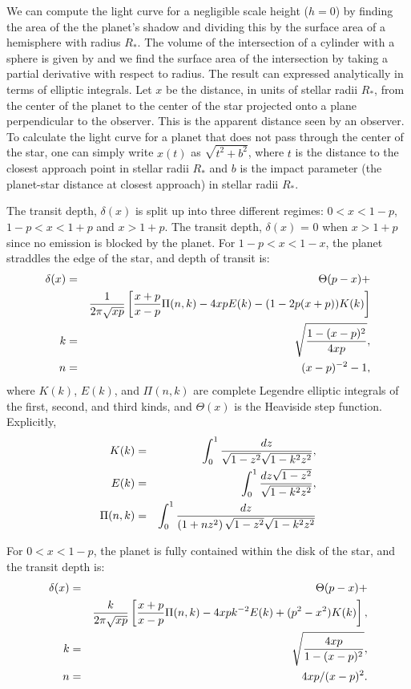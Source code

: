 \documentclass[manuscript]{aastex}
\begin{document}
We can compute the light curve for a negligible scale height ($h=0$) by finding the area of the the planet's shadow and dividing this by the surface area of a hemisphere with radius $R_*$. The volume of the intersection of a cylinder with a sphere is given by \citet{lamarche} and we find the surface area of the intersection by taking a partial derivative with respect to radius. The result can expressed analytically in terms of elliptic integrals.
Let $x$ be the distance, in units of stellar radii $R_*$, from the center of the planet to the center of the star projected onto a plane perpendicular to the observer. This is the apparent distance seen by an observer. To calculate the light curve for a planet that does not pass through the center of the star, one can simply write $x(t)$ as $\sqrt{t^2+b^2}$, where $t$ is the distance to the closest approach point in stellar radii $R_*$ and $b$ is the impact parameter (the planet-star distance at closest approach) in stellar radii $R_*$. 

The transit depth, $\delta (x)$ is split up into three different regimes: $0 < x < 1 -p$, $1 - p < x < 1+p$ and $ x > 1+p$. The transit depth, $\delta (x)$ = 0 when $x > 1 + p$ since no emission is blocked by the planet.
For $1-p < x < 1-x$, the planet straddles the edge of the star, and
depth of transit is:
\begin{eqnarray}\label{ingress}
\delta(x)&=&\Theta(p-x) +\\
&& {1\over 2 \pi \sqrt{xp}} \left[{x+p\over x-p}\Pi(n,k)-4xpE(k)-(1-2p(x+p))K(k)\right] \cr
k&=&\sqrt{1-(x-p)^2\over 4xp}, \cr 
n&=&(x-p)^{-2}-1,
\end{eqnarray}
where $K(k)$, $E(k)$, and $\Pi(n,k)$ are complete Legendre elliptic 
integrals of the first, second, and third kinds, and $\Theta(x)$ is
the Heaviside step function. Explicitly,
\begin{eqnarray}\label{ellipint}
K(k)&=&\int^1_0 {dz \over \sqrt{1-z^2}\sqrt{1-k^2 z^2}}, \cr
E(k)&=&\int^1_0 {dz \sqrt{1-z^2} \over \sqrt{1-k^2 z^2} }, \cr
\Pi(n,k)&=&\int^1_0 {dz \over \left( 1+n z^2 \right) \sqrt{1-z^2} \sqrt{1-k^2 z^2} }
\end{eqnarray}

For $0 < x < 1-p$, the planet is fully contained within the disk of the star,
and the transit depth is:
\begin{eqnarray}\label{disk}
\delta(x)&=&\Theta(p-x)+\\
&&{k\over 2 \pi \sqrt{xp}}\left[{x+p\over x-p}\Pi(n,k)-4xpk^{-2}E(k)
             +(p^2-x^2)K(k)\right],\cr
k&=&\sqrt{4xp\over 1-(x-p)^2},\cr
n&=&4xp/(x-p)^2.
\end{eqnarray}
\end{document}
